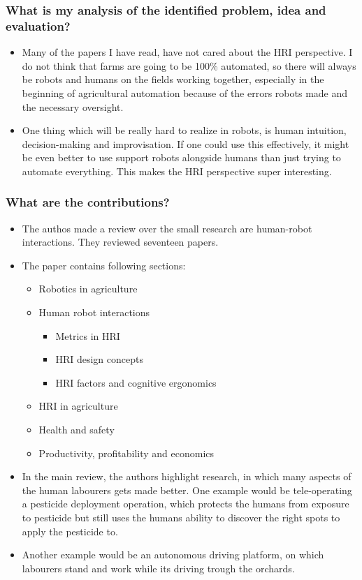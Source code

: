 \subsubsection*{What is my analysis of the identified problem, idea and evaluation?}
\begin{itemize}
    \item Many of the papers I have read, have not cared about the HRI perspective. I do not think that farms are going to be 100\% automated, so there will always be robots and humans on the fields working together, especially in the beginning of agricultural automation because of the errors robots made and the necessary oversight.
    \item One thing which will be really hard to realize in robots, is human intuition, decision-making and improvisation. If one could use this effectively, it might be even better to use support robots alongside humans than just trying to automate everything. This makes the HRI perspective super interesting.
\end{itemize}
\subsubsection*{What are the contributions?}
\begin{itemize}
    \item The authos made a review over the small research are human-robot interactions. They reviewed seventeen papers.
    \item The paper contains following sections: \ \begin{itemize}
        \item Robotics in agriculture
        \item Human robot interactions \ \begin{itemize}
            \item Metrics in HRI
            \item HRI design concepts
            \item HRI factors and cognitive ergonomics
        \end{itemize}
        \item HRI in agriculture
        \item Health and safety
        \item Productivity, profitability and economics
    \end{itemize}
    \item In the main review, the authors highlight research, in which many aspects of the human labourers gets made better. One example would be tele-operating a pesticide deployment operation, which protects the humans from exposure to pesticide but still uses the humans ability to discover the right spots to apply the pesticide to. 
    \item Another example would be an autonomous driving platform, on which labourers stand and work while its driving trough the orchards.
\end{itemize}
